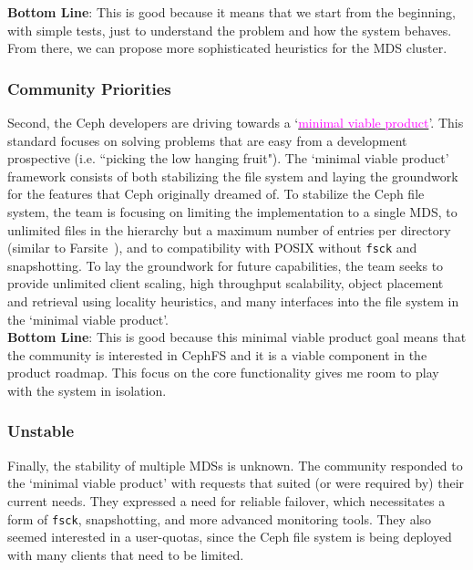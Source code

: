 \noindent\textbf{Bottom Line}: This is good because it means that we start from the beginning, with simple tests, just to understand the problem and how the system behaves. From there, we can propose more sophisticated heuristics for the MDS cluster. 

\subsubsection{Community Priorities}
Second, the Ceph developers are driving towards a `\href{http://ceph.com/dev-notes/cephfs-mds-status-discussion/}{\textcolor{magenta}{minimal viable product}}'. This standard focuses on solving problems that are easy from a development prospective (i.e. ``picking the low hanging fruit"). The `minimal viable product' framework consists of both stabilizing the file system and laying the groundwork for the features that Ceph originally dreamed of. To stabilize the Ceph file system, the team is focusing on limiting the implementation to a single MDS, to unlimited files in the hierarchy but a maximum number of entries per directory (similar to Farsite~\cite{doucer:osdi2006-farsite-dir}), and to compatibility with POSIX without \texttt{fsck} and snapshotting. To lay the groundwork for future capabilities, the team seeks to provide unlimited client scaling, high throughput scalability, object placement and retrieval using locality heuristics, and many interfaces into the file system in the `minimal viable product'. \\

\noindent\textbf{Bottom Line}: This is good because this minimal viable product goal means that the community is interested in CephFS and it is a viable component in the product roadmap. This focus on the core functionality gives me room to play with the system in isolation. 

\subsubsection{Unstable}
Finally, the stability of multiple MDSs is unknown. The community responded to the `minimal viable product' with requests that suited (or were required by) their current needs. They expressed a need for reliable failover, which necessitates a form of \texttt{fsck}, snapshotting, and more advanced monitoring tools. They also seemed interested in a user-quotas, since the Ceph file system is being deployed with many clients that need to be limited. 

